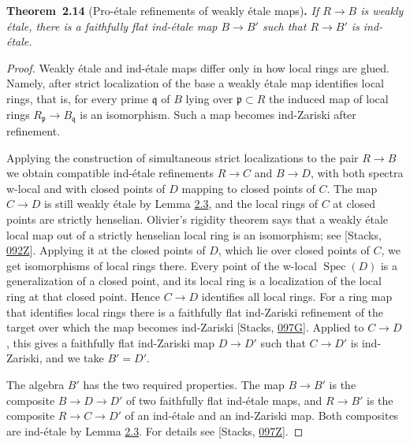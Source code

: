 \documentclass[11pt]{article}
\newenvironment{bpstatement}[2]{\par\addvspace{0.6\baselineskip}\noindent\textbf{#1}#2\textbf{.}\enspace\ignorespaces}
  {\par\addvspace{0.4\baselineskip}}
\newenvironment{bpstatementit}[2]{\begin{bpstatement}{#1}{#2}\itshape\ignorespaces}{\end{bpstatement}}
\begin{document}
\label{bp42}%
\begin{bpstatementit}{Theorem~2.14}{ (Pro-étale refinements of weakly étale maps)}
If \(R\to B\) is weakly étale, there is a faithfully flat ind-étale map \(B\to B'\) such that \(R\to B'\) is ind-étale.
\end{bpstatementit}

\begin{proof}[{Proof}]\label{bp43}%
Weakly étale and ind-étale maps differ only in how local rings are glued. Namely, after strict localization of the base a weakly étale map identifies local rings, that is, for every prime \(\mathfrak q\) of \(B\) lying over \(\mathfrak p\subset R\) the induced map of local rings \(R_{\mathfrak p}\to B_{\mathfrak q}\) is an isomorphism. Such a map becomes ind-Zariski after refinement.

Applying the construction of simultaneous strict localizations to the pair \(R\to B\) we obtain compatible ind-étale refinements \(R\to C\) and \(B\to D\), with both spectra w-local and with closed points of \(D\) mapping to closed points of \(C\). The map \(C\to D\) is still weakly étale by Lemma \hyperref[bp12]{2.3}, and the local rings of \(C\) at closed points are strictly henselian. Olivier's rigidity theorem says that a weakly étale local map out of a strictly henselian local ring is an isomorphism; see [Stacks, \href{https://stacks.math.columbia.edu/tag/092Z}{092Z}]. Applying it at the closed points of \(D\), which lie over closed points of \(C\), we get isomorphisms of local rings there. Every point of the w-local \(\operatorname{Spec}(D)\) is a generalization of a closed point, and its local ring is a localization of the local ring at that closed point. Hence \(C\to D\) identifies all local rings. For a ring map that identifies local rings there is a faithfully flat ind-Zariski refinement of the target over which the map becomes ind-Zariski [Stacks, \href{https://stacks.math.columbia.edu/tag/097G}{097G}]. Applied to \(C\to D\), this gives a faithfully flat ind-Zariski map \(D\to D'\) such that \(C\to D'\) is ind-Zariski, and we take \(B'=D'\).

The algebra \(B'\) has the two required properties. The map \(B\to B'\) is the composite \(B\to D\to D'\) of two faithfully flat ind-étale maps, and \(R\to B'\) is the composite \(R\to C\to D'\) of an ind-étale and an ind-Zariski map. Both composites are ind-étale by Lemma \hyperref[bp12]{2.3}. For details see [Stacks, \href{https://stacks.math.columbia.edu/tag/097Z}{097Z}].
\end{proof}
\end{document}
